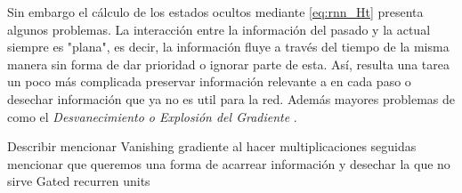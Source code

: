 Sin embargo el cálculo de los estados ocultos mediante \ref{eq:rnn_Ht} presenta algunos problemas.
La interacción entre la información del pasado y la actual siempre es "plana", es decir, la información
fluye a través del tiempo de la misma manera sin forma de dar prioridad o ignorar parte de
esta. Así, resulta una tarea un poco más complicada preservar información relevante a en cada paso
o desechar información que ya no es util para la red. Además mayores problemas de como el
\textit{Desvanecimiento o Explosión del Gradiente} \cite{VanishinGradient}.


Describir mencionar Vanishing gradiente al hacer multiplicaciones seguidas
mencionar que queremos una forma de acarrear información y desechar la que no sirve
Gated recurren units

